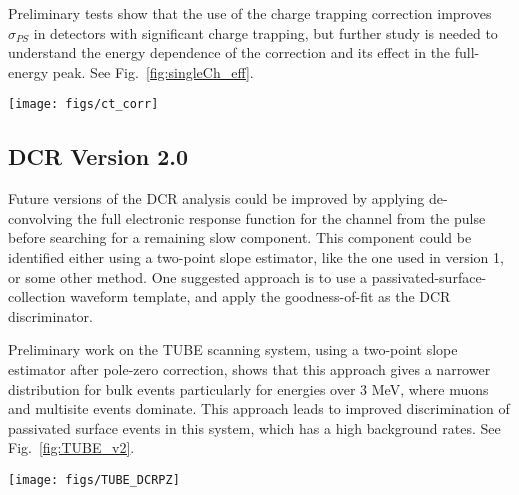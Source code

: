 \documentclass[groupedaddress,rmp,amsmath,amssymb,bibnotes,altaffilletter,twocolumn]{revtex4-1}
\begin{document}
Preliminary tests show that the use of the charge trapping correction improves $\sigma_{PS}$ in detectors with significant charge trapping, but further study is needed to understand the energy dependence of the correction and its effect in the full-energy peak. See Fig.~\ref{fig:singleCh_eff}.

\begin{figure*}[h]
 \centering
 \texttt{[image: figs/ct\_corr]}
 \caption{The steps of the charge trapping tail slope correction, in P42537A, a high charge trapping detector in DS3. {\it Left:} $\delta$ vs. $\Delta$E is plotted and fit with a line of slope $\ell_E$ for each energy peak. The fit is shown for the 2615 keV peak. {\it Center:} $\ell_E$ is plotted with respect to E and fit with an exponential, in red. {\it Right:} When corrected using the resulting parameters, the charge-trapping-corrected DCR distribution in the 2614 keV peak, in blue, is narrower and with a smaller high-DCR tail than the uncorrected distribution, in red.} 
 \label{fig:ct_corr}
\end{figure*}


\subsection{DCR Version 2.0}
Future versions of the DCR analysis could be improved by applying de-convolving the full electronic response function for the channel from the pulse before searching for a remaining slow component. This component could be identified either using a two-point slope estimator, like the one used in version 1, or some other method. One suggested approach is to use a passivated-surface-collection waveform template, and apply the goodness-of-fit as the DCR discriminator. 

Preliminary work on the TUBE scanning system, using a two-point slope estimator after pole-zero correction, shows that this approach gives a narrower distribution for bulk events particularly for energies over 3 MeV, where muons and multisite events dominate. This approach leads to improved discrimination of passivated surface events in this system, which has a high background rates. See Fig.~\ref{fig:TUBE_v2}.

\begin{figure*}[h]
 \centering
 \texttt{[image: figs/TUBE\_DCRPZ]}
 \caption{Preliminary tests of version 2.0 of the DCR parameter, in the TUBE scanning system. {\it Top:} The version 1.0 DCR distributions, for energies between 1 and 6~MeV. {\it Bottom:} The version 2.0 DCR distributions. The two-point slope DCR parameter is calculated and applied after a pole-zero correction is used to de-convolve the electronics response function. The use of version 2 leads to a narrower bulk-event distribution, particularly at energies above 3 MeV, where muons and multisite events dominate.} 
 \label{fig:TUBE_v2}
\end{figure*}
\end{document}
